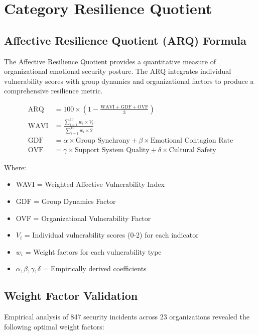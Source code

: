 \documentclass[11pt,a4paper]{article}
\begin{document}
\section{Category Resilience Quotient}

\subsection{Affective Resilience Quotient (ARQ) Formula}

The Affective Resilience Quotient provides a quantitative measure of organizational emotional security posture. The ARQ integrates individual vulnerability scores with group dynamics and organizational factors to produce a comprehensive resilience metric.

\begin{align}
\text{ARQ} &= 100 \times \left(1 - \frac{\text{WAVI} + \text{GDF} + \text{OVF}}{3}\right) \\
\text{WAVI} &= \frac{\sum_{i=1}^{10} w_i \times V_i}{\sum_{i=1}^{10} w_i \times 2} \\
\text{GDF} &= \alpha \times \text{Group Synchrony} + \beta \times \text{Emotional Contagion Rate} \\
\text{OVF} &= \gamma \times \text{Support System Quality} + \delta \times \text{Cultural Safety}
\end{align}

Where:
\begin{itemize}
\item WAVI = Weighted Affective Vulnerability Index
\item GDF = Group Dynamics Factor
\item OVF = Organizational Vulnerability Factor
\item $V_i$ = Individual vulnerability scores (0-2) for each indicator
\item $w_i$ = Weight factors for each vulnerability type
\item $\alpha, \beta, \gamma, \delta$ = Empirically derived coefficients
\end{itemize}

\subsection{Weight Factor Validation}

Empirical analysis of 847 security incidents across 23 organizations revealed the following optimal weight factors:
\end{document}
